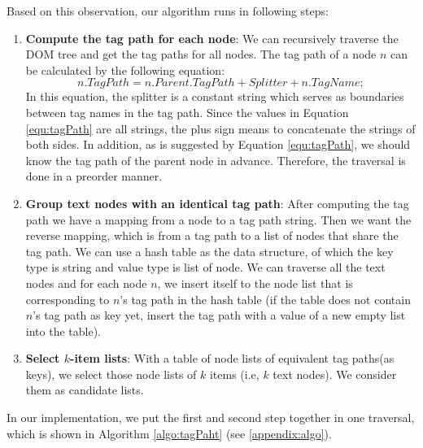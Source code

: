 Based on this observation, our algorithm runs in following steps:

\begin{enumerate}
  \item \textbf{Compute the tag path for each node}:
  We can recursively traverse the DOM tree and get the tag paths for all nodes.
  The tag path of a node $n$ can be calculated by the following equation:
  \begin{equation}\label{equ:tagPath}
    n.TagPath=n.Parent.TagPath+Splitter+n.TagName;
  \end{equation}
  In this equation, the splitter is a constant string which serves as boundaries between tag names in the tag path.
  Since the values in Equation \ref{equ:tagPath} are all strings,
  the plus sign means to concatenate the strings of both sides.
  In addition, as is suggested by Equation \ref{equ:tagPath}, we should know the tag path of the parent node in advance.
  Therefore, the traversal is done in a preorder manner.

  \item \textbf{Group text nodes with an identical tag path}:
  After computing the tag path we have a mapping from a node to a tag path string. Then we want the reverse mapping,
  which is from a tag path to a list of nodes that share the tag path. We can use a hash table as the data structure, of which the key type is string and value type is list of node.
  We can traverse all the text nodes and for each node $n$,
  we insert itself to the node list that is corresponding to $n$'s tag path in the hash table
  (if the table does not contain $n$'s tag path as key yet, insert the tag path with a value of a new empty list into the table).

  \item \textbf{Select $k$-item lists}:
  With a table of node lists of equivalent tag paths(as keys), we select those node lists of $k$ items (i.e, $k$ text nodes).
  We consider them as candidate lists.
\end{enumerate}

In our implementation, we put the first and second step together in one traversal, which is shown in Algorithm \ref{algo:tagPaht} 
(see \ref{appendix:algo}).




